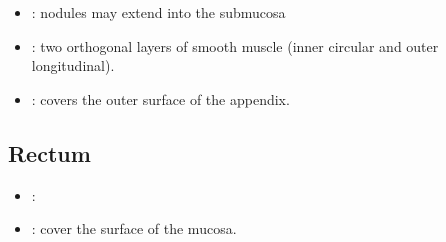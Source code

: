 \begin{itemize}
\begin{multicols}{2}
\begin{itemize}
    \begin{center}
    \end{center}
    
    \item {}: nodules may extend into the submucosa
    
    \begin{center}
    \end{center}
    
    \item {}: two orthogonal layers of smooth muscle (inner circular and outer longitudinal).
    
    \begin{center}
    \end{center}
    
    \item {}: covers the outer surface of the appendix.
    
    \begin{center}
    \end{center}
    
  \end{itemize}
  \end{multicols}

  \subsection{Rectum}\label{Rectum}
  \begin{center}
  \end{center}
  \begin{multicols}{2}
  \begin{itemize}
    \item {}:
    
    \begin{center}
    \end{center}
    
    \item {}: cover the surface of the mucosa.
    
    \begin{center}
    \end{center}
    

\end{itemize}
\end{multicols}
\end{itemize}
